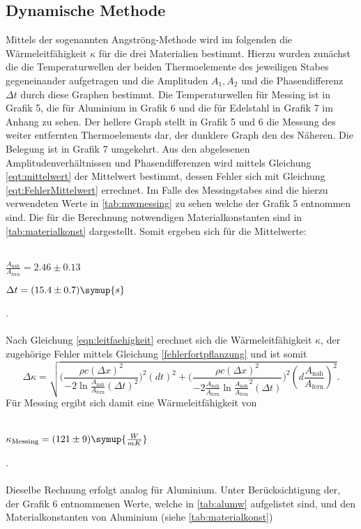 \subsection{Dynamische Methode}
Mittels der sogenannten Angströng-Methode wird im folgenden die Wärmeleitfähigkeit $\kappa$ für die drei Materialien bestimmt.
Hierzu wurden zunächst die die Temperaturwellen der beiden Thermoelemente des jeweiligen Stabes gegeneinander aufgetragen und die Amplituden $A_1,A_2$ und die Phasendifferenz $\Delta t$ durch diese Graphen bestimmt.
Die Temperaturwellen für Messing ist in Grafik 5, die für Aluminium in Grafik 6 und die für Edelstahl in Grafik 7 im Anhang zu sehen. Der hellere Graph stellt in Grafik 5 und 6
die Messung des weiter entfernten Thermoelements dar, der dunklere Graph den des Näheren. Die Belegung ist in Grafik 7 umgekehrt.
Aus den abgelesenen Amplitudenverhältnissen und Phasendifferenzen wird mittels Gleichung \eqref{eqt:mittelwert} der Mittelwert bestimmt, dessen Fehler sich mit Gleichung \eqref{eqt:FehlerMittelwert} errechnet.
Im Falle des Messingstabes sind die hierzu verwendeten Werte in \autoref{tab:mwmessing} zu sehen welche der Grafik 5 entnommen sind.
Die für die Berechnung notwendigen Materialkonstanten sind in \autoref{tab:materialkonst} dargestellt.
Somit ergeben sich für die Mittelwerte:
\\ \\
\centerline{$\frac{A_\text{nah}}{A_\text{fern}} = 2.46 \pm 0.13$}
\centerline{$\Delta t = (15.4 \pm 0.7) \symup{s}$}.
\\ \\
Nach Gleichung \eqref{eqn:leitfaehigkeit} erechnet sich die Wärmeleitfähigkeit $\kappa$, der zugehörige Fehler mittels Gleichung \eqref{fehlerfortpflanzung}
und ist somit 
\begin{equation}
\label{eqt:fehlerkappa}
\Delta \kappa = \sqrt{\biggl (\frac{\rho c (\Delta x)^2}{-2 \ln{\frac{A_\text{nah}}{A_\text{fern}}} (\Delta t)^2 }\biggr)^2(dt)^2 + \biggl(\frac{\rho c (\Delta x)^2}{-2 \frac{A_\text{nah}}{A_\text{fern}} \ln{\frac{A_\text{nah}}{A_\text{fern}}}^2 (\Delta t)} \biggr )^2 (d\frac{A_\text{nah}}{A_\text{fern}})^2 }.
\end{equation}
Für Messing ergibt sich damit eine Wärmeleitfähigkeit von
\\ \\
\centerline{$\kappa_\text{Messing} = (121 \pm 9) \symup{\frac{W}{mK}}$}.
\\ \\
Dieselbe Rechnung erfolgt analog für Aluminium.
Unter Berücksichtigung der, der Grafik 6 entnommenen Werte, welche in \autoref{tab:alumw} aufgelistet sind, und den Materialkonstanten von Aluminium (siehe \autoref{tab:materialkonst})

